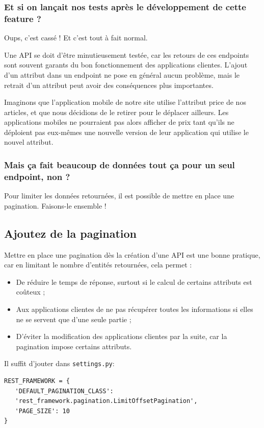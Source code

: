 \documentclass[a4paper]{article}
\begin{document}
\subsubsection*{Et si on lançait nos tests après le développement de cette feature ?}
Oups, c’est cassé ! Et c’est tout à fait {\color{monOrange}normal}.

Une API se doit d’être minutieusement {\color{monOrange}testée}, car les retours de ces endpoints sont souvent garants du bon fonctionnement des applications clientes. L’ajout d’un attribut dans un endpoint ne pose en général aucun problème, mais le {\color{monOrange}retrait} d’un attribut peut avoir des conséquences plus importantes.

Imaginons que l’application mobile de notre site utilise l’attribut price  de nos articles, et que nous décidions de le {\color{monOrange}retirer} pour le déplacer ailleurs. Les applications mobiles ne pourraient pas alors afficher de prix tant qu’ils ne déploient pas eux-mêmes une nouvelle version de leur application qui utilise le {\color{monOrange}nouvel attribut}.

\subsubsection*{Mais ça fait beaucoup de données tout ça pour un seul endpoint, non ?}
Pour limiter les données retournées, il est possible de mettre en place une {\color{monOrange}pagination}. Faisons-le ensemble !
\subsection{Ajoutez de la pagination}
Mettre en place une pagination dès la création d’une API est une bonne pratique, car en limitant le nombre d’entités retournées, cela permet :
\begin{itemize}
\item De réduire le temps de réponse, surtout si le calcul de certains attributs est coûteux ;
\item Aux applications clientes de ne pas récupérer toutes les informations si elles ne se servent que d’une seule partie ;
\item D’éviter la modification des applications clientes par la suite, car la pagination impose certains attributs.
\end{itemize}
Il suffit d'jouter dans {\tt settings.py}:
\begin{verbatim}
REST_FRAMEWORK = {
   'DEFAULT_PAGINATION_CLASS':
   'rest_framework.pagination.LimitOffsetPagination',
   'PAGE_SIZE': 10
}
\end{verbatim}
\end{document}
